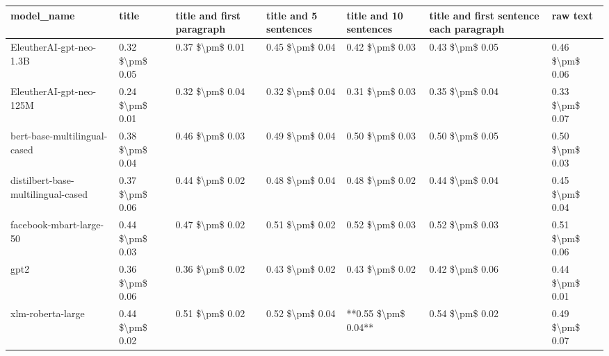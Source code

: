 \begin{tabular}{lllllll}
\toprule
                        model\_name &           title & title and first paragraph & title and 5 sentences & title and 10 sentences & title and first sentence each paragraph &        raw text \\
\midrule
           EleutherAI-gpt-neo-1.3B & 0.32 \$\textbackslash pm\$ 0.05 &           0.37 \$\textbackslash pm\$ 0.01 &       0.45 \$\textbackslash pm\$ 0.04 &        0.42 \$\textbackslash pm\$ 0.03 &                         0.43 \$\textbackslash pm\$ 0.05 & 0.46 \$\textbackslash pm\$ 0.06 \\
           EleutherAI-gpt-neo-125M & 0.24 \$\textbackslash pm\$ 0.01 &           0.32 \$\textbackslash pm\$ 0.04 &       0.32 \$\textbackslash pm\$ 0.04 &        0.31 \$\textbackslash pm\$ 0.03 &                         0.35 \$\textbackslash pm\$ 0.04 & 0.33 \$\textbackslash pm\$ 0.07 \\
      bert-base-multilingual-cased & 0.38 \$\textbackslash pm\$ 0.04 &           0.46 \$\textbackslash pm\$ 0.03 &       0.49 \$\textbackslash pm\$ 0.04 &        0.50 \$\textbackslash pm\$ 0.03 &                         0.50 \$\textbackslash pm\$ 0.05 & 0.50 \$\textbackslash pm\$ 0.03 \\
distilbert-base-multilingual-cased & 0.37 \$\textbackslash pm\$ 0.06 &           0.44 \$\textbackslash pm\$ 0.02 &       0.48 \$\textbackslash pm\$ 0.04 &        0.48 \$\textbackslash pm\$ 0.02 &                         0.44 \$\textbackslash pm\$ 0.04 & 0.45 \$\textbackslash pm\$ 0.04 \\
           facebook-mbart-large-50 & 0.44 \$\textbackslash pm\$ 0.03 &           0.47 \$\textbackslash pm\$ 0.02 &       0.51 \$\textbackslash pm\$ 0.02 &        0.52 \$\textbackslash pm\$ 0.03 &                         0.52 \$\textbackslash pm\$ 0.03 & 0.51 \$\textbackslash pm\$ 0.06 \\
                              gpt2 & 0.36 \$\textbackslash pm\$ 0.06 &           0.36 \$\textbackslash pm\$ 0.02 &       0.43 \$\textbackslash pm\$ 0.02 &        0.43 \$\textbackslash pm\$ 0.02 &                         0.42 \$\textbackslash pm\$ 0.06 & 0.44 \$\textbackslash pm\$ 0.01 \\
                 xlm-roberta-large & 0.44 \$\textbackslash pm\$ 0.02 &           0.51 \$\textbackslash pm\$ 0.02 &       0.52 \$\textbackslash pm\$ 0.04 &    **0.55 \$\textbackslash pm\$ 0.04** &                         0.54 \$\textbackslash pm\$ 0.02 & 0.49 \$\textbackslash pm\$ 0.07 \\
\bottomrule
\end{tabular}
